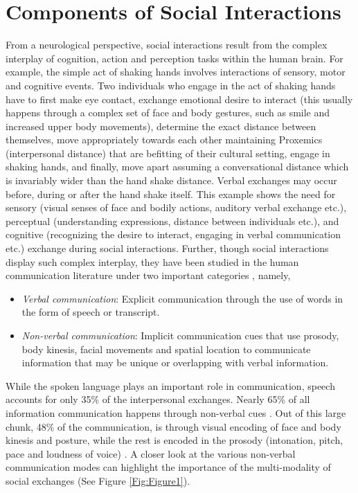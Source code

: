 \documentclass[oneside,11pt]{memoir}
\begin{document}
\section{Components of Social Interactions}
From a neurological perspective, social interactions result from the complex interplay of cognition, action and perception tasks within the human brain. For example, the simple act of shaking hands involves interactions of sensory, motor and cognitive events. Two individuals who engage in the act of shaking hands have to first make eye contact, exchange emotional desire to interact (this usually happens through a complex set of face and body gestures, such as smile and increased upper body movements), determine the exact distance between themselves, move appropriately towards each other maintaining Proxemics (interpersonal distance) that are befitting of their cultural setting, engage in shaking hands, and finally, move apart assuming a conversational distance which is invariably wider than the hand shake distance. Verbal exchanges may occur before, during or after the hand shake itself. This example shows the need for sensory (visual senses of face and bodily actions, auditory verbal exchange etc.), perceptual (understanding expressions, distance between individuals etc.), and cognitive (recognizing the desire to interact, engaging in verbal communication etc.) exchange during social interactions. Further, though social interactions display such complex interplay, they have been studied in the human communication literature under two important categories \cite{brent_d._ruben_human_1975}, namely,

\begin{itemize}
\item \emph {Verbal communication}: Explicit communication through the use of words in the form of speech or transcript.
\item \emph {Non-verbal communication}: Implicit communication cues that use prosody, body kinesis, facial movements and spatial location to communicate information that may be unique or overlapping with verbal information.
\end{itemize}

While the spoken language plays an important role in communication, speech accounts for only 35\% of the interpersonal exchanges. Nearly 65\% of all information communication happens through non-verbal cues \cite{knapp_nonverbal_1996}. Out of this large chunk, 48\% of the communication, is through visual encoding of face and body kinesis and posture, while the rest is encoded in the prosody (intonation, pitch, pace and loudness of voice) \cite{borkenau_thin_2004}. A closer look at the various non-verbal communication modes can highlight the importance of the multi-modality of social exchanges (See Figure \ref{Fig:Figure1}).
\end{document}
